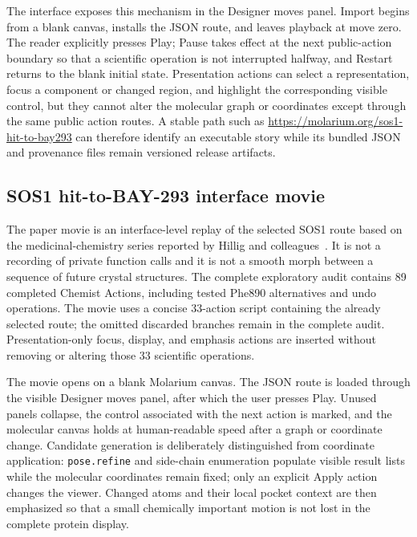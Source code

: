 The interface exposes this mechanism in the Designer moves panel.
Import begins from a blank canvas, installs the JSON route, and leaves playback
at move zero.
The reader explicitly presses Play; Pause takes effect at the next public-action
boundary so that a scientific operation is not interrupted halfway, and
Restart returns to the blank initial state.
Presentation actions can select a representation, focus a component or changed
region, and highlight the corresponding visible control, but they cannot alter
the molecular graph or coordinates except through the same public action routes.
A stable path such as \url{https://molarium.org/sos1-hit-to-bay293} can therefore
identify an executable story while its bundled JSON and provenance files remain
versioned release artifacts.

\subsection{SOS1 hit-to-BAY-293 interface movie}
\label{app:sos1-movie}

The paper movie is an interface-level replay of the selected SOS1 route based on
the medicinal-chemistry series reported by Hillig and colleagues~\cite{hillig2019bay293}.
It is not a recording of private function calls and it is not a smooth morph
between a sequence of future crystal structures.
The complete exploratory audit contains 89 completed Chemist Actions, including
tested Phe890 alternatives and undo operations.
The movie uses a concise 33-action script containing the already selected route;
the omitted discarded branches remain in the complete audit.
Presentation-only focus, display, and emphasis actions are inserted without
removing or altering those 33 scientific operations.

The movie opens on a blank Molarium canvas.
The JSON route is loaded through the visible Designer moves panel, after which
the user presses Play.
Unused panels collapse, the control associated with the next action is marked,
and the molecular canvas holds at human-readable speed after a graph or
coordinate change.
Candidate generation is deliberately distinguished from coordinate
application: \texttt{pose.refine} and side-chain enumeration populate visible
result lists while the molecular coordinates remain fixed; only an explicit
Apply action changes the viewer.
Changed atoms and their local pocket context are then emphasized so that a
small chemically important motion is not lost in the complete protein display.

